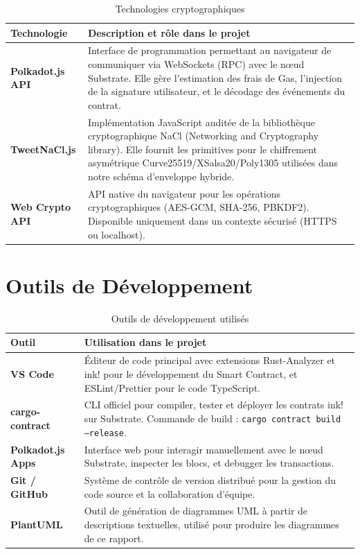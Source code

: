 \documentclass[12pt,a4paper]{report}
\begin{document}
\begin{table}[H]
    \centering
    \caption{Technologies cryptographiques}
    \label{tab:tech_crypto}
    \begin{tabular}{|p{3.5cm}|p{10cm}|}
        \hline
        \textbf{Technologie} & \textbf{Description et rôle dans le projet} \\
        \hline
        \textbf{Polkadot.js API} & Interface de programmation permettant au navigateur de communiquer via WebSockets (RPC) avec le nœud Substrate. Elle gère l'estimation des frais de Gas, l'injection de la signature utilisateur, et le décodage des événements du contrat. \\
        \hline
        \textbf{TweetNaCl.js} & Implémentation JavaScript auditée de la bibliothèque cryptographique NaCl (Networking and Cryptography library). Elle fournit les primitives pour le chiffrement asymétrique Curve25519/XSalsa20/Poly1305 utilisées dans notre schéma d'enveloppe hybride. \\
        \hline
        \textbf{Web Crypto API} & API native du navigateur pour les opérations cryptographiques (AES-GCM, SHA-256, PBKDF2). Disponible uniquement dans un contexte sécurisé (HTTPS ou localhost). \\
        \hline
    \end{tabular}
\end{table}

\section{Outils de Développement}

\begin{table}[H]
    \centering
    \caption{Outils de développement utilisés}
    \label{tab:outils}
    \begin{tabular}{|p{3.5cm}|p{10cm}|}
        \hline
        \textbf{Outil} & \textbf{Utilisation dans le projet} \\
        \hline
        \textbf{VS Code} & Éditeur de code principal avec extensions Rust-Analyzer et ink! pour le développement du Smart Contract, et ESLint/Prettier pour le code TypeScript. \\
        \hline
        \textbf{cargo-contract} & CLI officiel pour compiler, tester et déployer les contrats ink! sur Substrate. Commande de build : \texttt{cargo contract build --release}. \\
        \hline
        \textbf{Polkadot.js Apps} & Interface web pour interagir manuellement avec le nœud Substrate, inspecter les blocs, et debugger les transactions. \\
        \hline
        \textbf{Git / GitHub} & Système de contrôle de version distribué pour la gestion du code source et la collaboration d'équipe. \\
        \hline
        \textbf{PlantUML} & Outil de génération de diagrammes UML à partir de descriptions textuelles, utilisé pour produire les diagrammes de ce rapport. \\
        \hline
    \end{tabular}
\end{table}
\end{document}
